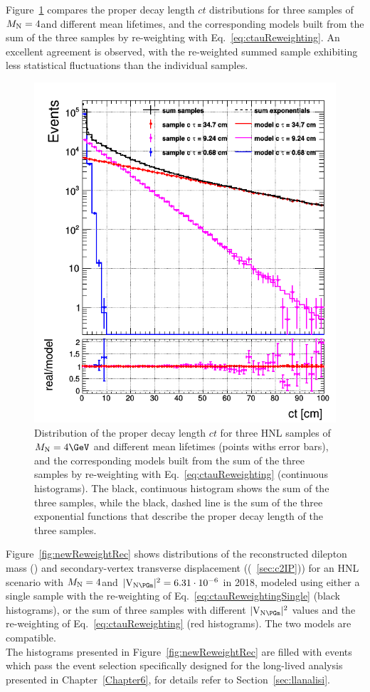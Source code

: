 Figure~\ref{fig:newReweightGen} compares the proper decay length $ct$
distributions for three samples of $M_{\mathrm{N}}=4$\GeV and different mean
lifetimes, and the corresponding models built from the sum of the
three samples by re-weighting with Eq.~\ref{eq:ctauReweighting}. An
excellent agreement is observed, with the re-weighted summed sample
exhibiting less statistical fluctuations than the individual samples.
\begin{figure}[h!]
  \centering
  \includegraphics[width = .55\textwidth]{Figures/c4/reweighting/ctau_genLevel_unskimmed.png}
  \caption{Distribution of the proper decay length $ct$ for three HNL
    samples of $\mhnl=4\GeV$ and different mean lifetimes (points withs
    error bars),
    and the corresponding models built from the sum of the three
    samples by re-weighting with Eq.~\ref{eq:ctauReweighting}
    (continuous histograms). The black, continuous histogram shows the
    sum of the three samples, while the black, dashed line is the sum
    of the three exponential functions that describe the proper decay
    length of the three samples. \dani}
  \label{fig:newReweightGen}
\end{figure}


Figure~\ref{fig:newReweightRec} shows distributions of the
reconstructed dilepton mass (\mtwol) and secondary-vertex transverse
displacement (\Deltwod (~\ref{sec:c2IP})) for an HNL scenario with
$M_{\mathrm{N}}=4$\GeV and $\mixparm = 6.31\cdot 10^{-6}$ in 2018,
modeled using either a single sample with the re-weighting of
Eq.~\ref{eq:ctauReweightingSingle} (black histograms), or the sum of
three samples with different $\mixparm$ values and the re-weighting of
Eq.~\ref{eq:ctauReweighting} (red histograms). The two models are compatible.\\
The histograms
presented in Figure~\ref{fig:newReweightRec} are filled with events
which pass the event selection specifically designed for the
long-lived analysis presented in Chapter~\ref{Chapter6}, for details
refer to Section~\ref{sec:llanalisi}. 


